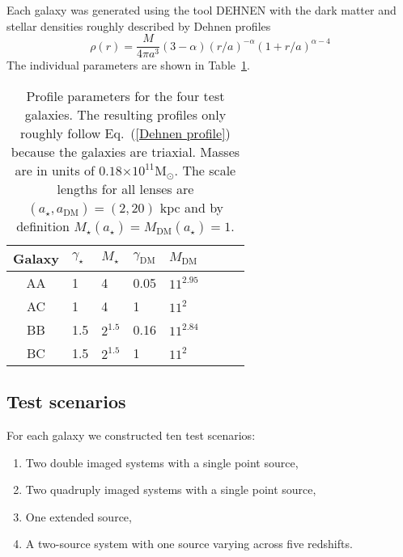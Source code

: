 \documentclass[onecolumn,galley]{mn2e}
\newcommand{\Msun}{\ensuremath{\mathrm{M}_\odot}}
\newcommand{\tabref}[1] {Table~\ref{#1}}
\newcommand{\eqnref}[1] {Eq.~(\ref{#1})}
\newcommand{\e}[1]{\ensuremath{\times 10^{#1}}}
\begin{document}

Each galaxy was generated using the tool DEHNEN with the dark matter and stellar
densities roughly described by Dehnen profiles
%
\begin{equation}
\rho(r) = \frac{M}{4\pi a^3}(3-\alpha){(r/a)^{-\alpha}(1 + r/a)^{\alpha-4}}
\label{Dehnen profile}
\end{equation}
%
The individual parameters are shown in \tabref{Lens profile params}. 

\begin{table}
\begin{tabular}{clllllll}
Galaxy & $\gamma_\star$ & $M_\star$ & $\gamma_\mathrm{DM}$ & $M_\mathrm{DM}$ \\
\hline
AA & 1 & 4 & 0.05 & $11^{2.95}$ \\
AC & 1 & 4 & 1 & $11^2$ \\
BB & 1.5 & $2^{1.5}$ & 0.16 & $11^{2.84}$ \\
BC & 1.5 & $2^{1.5}$ & 1 & $11^2$
\end{tabular}
\caption{Profile parameters for the four test galaxies. The resulting profiles only roughly follow
\eqnref{Dehnen profile} because the galaxies are triaxial. Masses are in units of $0.18\e{11}\Msun$. The scale lengths for
all lenses are $(a_\star,a_\mathrm{DM})=(2,20)$ kpc and by definition
$M_\star(a_\star) = M_\mathrm{DM}(a_\star) = 1$.}
\label{Lens profile params}
\end{table}



\subsection{Test scenarios} %

For each galaxy we constructed ten test scenarios:
\begin{enumerate}
\item Two double imaged systems with a single point source,
\item Two quadruply imaged systems with a single point source,
\item One extended source, 
\item A two-source system with one source varying across five redshifts. 
\end{enumerate}
\end{document}
